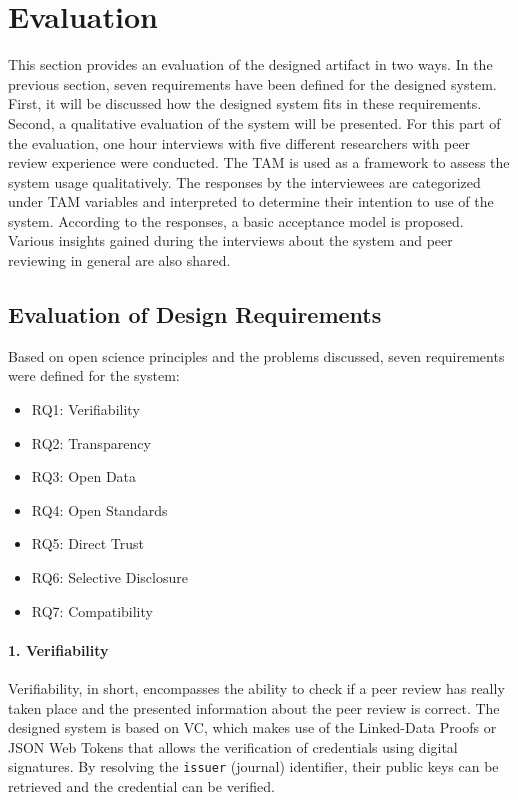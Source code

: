 
\chapter{Evaluation}\label{chapter:evaluation}

This section provides an evaluation of the designed artifact in two ways. In the previous section, seven requirements have been defined for the designed system. First, it will be discussed how the designed system fits in these requirements. Second, a qualitative evaluation of the system will be presented. For this part of the evaluation, one hour interviews with five different researchers with peer review experience were conducted. The \acrfull{TAM} is used as a framework to assess the system usage qualitatively. The responses by the interviewees are categorized under \acrshort{TAM} variables and interpreted to determine their intention to use of the system. According to the responses, a basic acceptance model is proposed. Various insights gained during the interviews about the system and peer reviewing in general are also shared.

\section{Evaluation of Design Requirements}

Based on open science principles and the problems discussed, seven requirements were defined for the system:

\begin{itemize}
  \item RQ1: Verifiability 
  \item RQ2: Transparency 
  \item RQ3: Open Data 
  \item RQ4: Open Standards 
  \item RQ5: Direct Trust 
  \item RQ6: Selective Disclosure 
  \item RQ7: Compatibility 
\end{itemize}

\subsubsection{1. Verifiability}

Verifiability, in short, encompasses the ability to check if a peer review has really taken place and the presented information about the peer review is correct. The designed system is based on \acrlong{VC}, which makes use of the Linked-Data Proofs or \acrshort{JSON} Web Tokens that allows the verification of credentials using digital signatures. By resolving the \lstinline{issuer} (journal) identifier, their public keys can be retrieved and the credential can be verified. 

